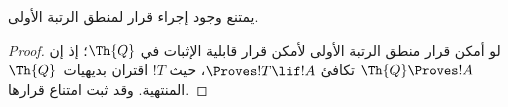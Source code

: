 \documentclass[../../../include/open-logic-section]{subfiles}
\begin{document}
\begin{cor}
يمتنع وجود إجراء قرار لمنطق الرتبة الأولى.
\end{cor}

\begin{proof}
لو أمكن قرار منطق الرتبة الأولى لأمكن قرار قابلية الإثبات في
$\Th{Q}$؛ إذ إن $\Th{Q}\Proves !A$ تكافئ
$\Proves !T\lif !A$، حيث $!T$ اقتران بديهيات~$\Th{Q}$ المنتهية.
وقد ثبت امتناع قرارها.
\end{proof}
\end{document}
